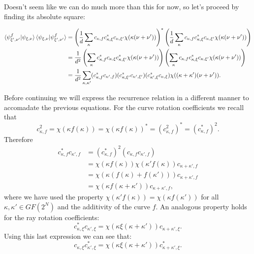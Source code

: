 \documentclass[a4paper]{article}
\begin{document}
  Doesn't seem like we can do much more than this for now,
  so let's proceed by finding its absolute square:

  \begin{align}
    \braket{\psi_{\xi',\nu'}^f|\psi_{\xi,\nu}}
    \braket{\psi_{\xi,\nu}|\psi_{\xi',\nu'}^f}
    &= \left( 
      \frac{1}{d} \sum_{\kappa}^{} c_{\kappa,f} 
      c_{\kappa,\xi}^* c_{\kappa,\xi'} \chi(\kappa(\nu+\nu'))
    \right)^*
    \left( 
      \frac{1}{d} \sum_{\kappa}^{} c_{\kappa,f} 
      c_{\kappa,\xi}^* c_{\kappa,\xi'} \chi(\kappa(\nu+\nu'))
    \right) \\
    &= \frac{1}{d^2} 
    \left( 
      \sum_{\kappa}^{} c_{\kappa,f}^* 
      c_{\kappa,\xi} c_{\kappa,\xi'}^* \chi(\kappa(\nu+\nu'))
    \right)
    \left( 
      \sum_{\kappa}^{} c_{\kappa,f} 
      c_{\kappa,\xi}^* c_{\kappa,\xi'} \chi(\kappa(\nu+\nu'))
    \right) \\
    &= \frac{1}{d^2} 
    \sum_{\kappa,\kappa'}^{}  
    (c_{\kappa,f}^* c_{\kappa',f})
    (c_{\kappa,\xi'}^* c_{\kappa',\xi'})
    (c_{\kappa',\xi}^* c_{\kappa,\xi})
    \chi((\kappa+\kappa')(\nu+\nu')).
    \label{eqn:squared_modulus}
  \end{align}

  Before continuing we will express the recurrence relation
  in a different manner to accomadate the previous
  equations. For the curve rotation coefficients we recall
  that 
  \begin{equation}
    c_{\kappa,f}^2
    = \chi(\kappa f(\kappa))
    = \chi(\kappa f(\kappa))^*
    = \left( c_{\kappa,f}^2 \right)^*
    = \left( c_{\kappa,f}^* \right)^2.
  \end{equation}
  Therefore
  \begin{align}
    c_{\kappa,f}^* c_{\kappa',f}
    &= \left(c_{\kappa,f}^*\right)^2 (c_{\kappa,f}
    c_{\kappa',f}) \\
    &= \chi(\kappa f(\kappa)) \chi(\kappa' f(\kappa))
    c_{\kappa+\kappa',f}  \\
    &= \chi\left( \kappa(f(\kappa) +f(\kappa')) \right) 
    c_{\kappa+\kappa',f} \\
    &= \chi\left( \kappa f(\kappa + \kappa') \right) 
    c_{\kappa+\kappa',f},
  \end{align}
  where we have used the property $\chi(\kappa' f(\kappa)) =
  \chi(\kappa f(\kappa'))$ for all $\kappa,\kappa' \in
  GF(2^N)$ and the additivity of the curve $f$. An analogous
  property holds for the ray rotation coefficients:
  \begin{equation}
    c_{\kappa,\xi}^* c_{\kappa',\xi}
    = \chi\left( \kappa \xi(\kappa+\kappa') \right) 
    c_{\kappa+\kappa',\xi}.
  \end{equation}
  Using this last expression we can see that:
  \begin{equation}
    c_{\kappa,\xi} c_{\kappa',\xi}^*
    = \chi(\kappa \xi(\kappa + \kappa')) c_{\kappa +
    \kappa',\xi}^*.
  \end{equation}
\end{document}
